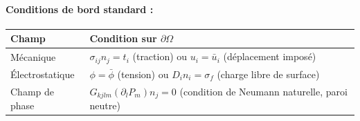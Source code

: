 \documentclass[11pt, a4paper]{article}
\begin{document}
\paragraph{Conditions de bord standard :}
\begin{table}[h]
\centering
\begin{tabular}{lp{10cm}}
\toprule
\textbf{Champ} & \textbf{Condition sur $\partial\Omega$} \\
\midrule
Mécanique & $\sigma_{ij}n_j = t_i$ (traction) ou $u_i = \bar{u}_i$ (déplacement imposé) \\
Électrostatique & $\phi = \bar{\phi}$ (tension) ou $D_i n_i = \sigma_f$ (charge libre de surface) \\
Champ de phase & $G_{kjlm}(\partial_l P_m)n_j = 0$ (condition de Neumann naturelle, paroi neutre) \\
\bottomrule
\end{tabular}
\end{table}
\end{document}
